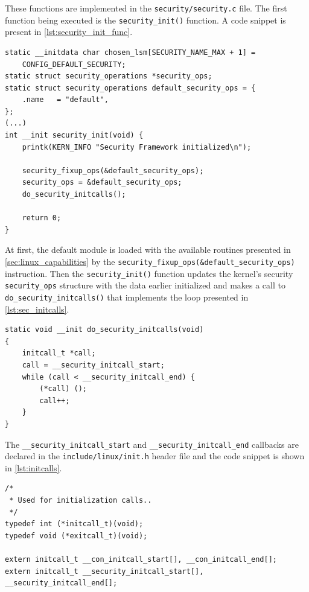 These functions are implemented in the \texttt{security/security.c} file. The first function being executed is the \texttt{security\_init()} function. A code snippet is present in \autoref{lst:security_init_func}.

\begin{lstlisting}[caption=Code snippet of the \texttt{security\_init()} function (Linux kernel v3.11), label=lst:security_init_func]
static __initdata char chosen_lsm[SECURITY_NAME_MAX + 1] =
	CONFIG_DEFAULT_SECURITY;
static struct security_operations *security_ops;
static struct security_operations default_security_ops = {
	.name	= "default",
};
(...)
int __init security_init(void) {
	printk(KERN_INFO "Security Framework initialized\n");
	
	security_fixup_ops(&default_security_ops);
	security_ops = &default_security_ops;
	do_security_initcalls();

	return 0;
}
\end{lstlisting}

At first, the default module is loaded with the available routines presented in \autoref{sec:linux_capabilities} by the \texttt{security\_fixup\_ops(\&default\_security\_ops)} instruction. Then the \texttt{security\_init()} function updates the kernel's security \texttt{security\_ops} structure with the data earlier initialized and makes a call to \texttt{do\_security\_initcalls()} that implements the loop presented in \autoref{lst:sec_initcalls}.

\begin{lstlisting}[caption=Code snippet of the \texttt{do\_security\_initcalls()} function (Linux kernel v3.11), label=lst:sec_initcalls]
static void __init do_security_initcalls(void)
{
	initcall_t *call;
	call = __security_initcall_start;
	while (call < __security_initcall_end) {
		(*call) ();
		call++;
	}
}
\end{lstlisting}

The \texttt{\_\_security\_initcall\_start} and \texttt{\_\_security\_initcall\_end} callbacks are declared in the \texttt{include/linux/init.h} header file and the code snippet is shown in \autoref{lst:initcalls}.

\begin{lstlisting}[caption=Code snippet of the \texttt{init} callbacks (Linux kernel v3.11), label=lst:initcalls]
/*
 * Used for initialization calls..
 */
typedef int (*initcall_t)(void);
typedef void (*exitcall_t)(void);

extern initcall_t __con_initcall_start[], __con_initcall_end[];
extern initcall_t __security_initcall_start[], __security_initcall_end[];
\end{lstlisting}

